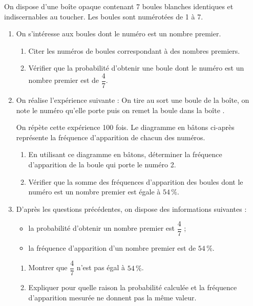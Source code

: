 On dispose d'une boîte opaque contenant 7 boules blanches identiques et indiscernables au toucher. Les boules sont numérotées de 1 à 7.

\begin{enumerate}
	\item On s'intéresse aux boules dont le numéro est un nombre premier.
	\begin{enumerate}
		\item Citer les numéros de boules correspondant à des nombres premiers.
		\item Vérifier que la probabilité d'obtenir une boule dont le numéro est un nombre premier est de $\dfrac{4}{7}$.
	\end{enumerate}
	\item On réalise l'expérience suivante : \og On tire au sort une boule de la boîte, on note le numéro qu'elle porte puis on remet la boule dans la boîte \fg.
	
	On répète cette expérience 100 fois. Le diagramme en bâtons ci-après représente la fréquence d'apparition de chacun des numéros.

\begin{center}
	\end{center}

	\begin{enumerate}
		\item En utilisant ce diagramme en bâtons, déterminer la fréquence d'apparition de la boule qui porte le numéro 2.
		\item Vérifier que la somme des fréquences d'apparition des boules dont le numéro est un nombre premier est égale à $54\,\%$.
	\end{enumerate}
	\item D'après les questions précédentes, on dispose des informations suivantes :
	\begin{itemize}
		\item la probabilité d'obtenir un nombre premier est $\dfrac{4}{7}$ ;
		\item la fréquence d'apparition d'un nombre premier est de $54\,\%$.
	\end{itemize}
	\begin{enumerate}
		\item Montrer que $\dfrac{4}{7}$ n'est pas égal à $54\,\%$.
		\item Expliquer pour quelle raison la probabilité calculée et la fréquence d'apparition mesurée ne donnent pas la même valeur.
	\end{enumerate}
\end{enumerate}

